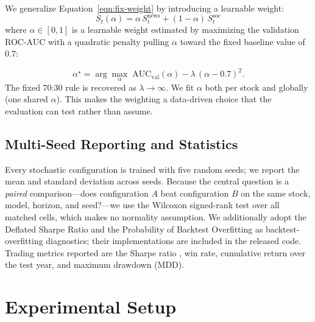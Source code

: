 \documentclass[conference]{IEEEtran}
\begin{document}
We generalize Equation~\ref{eqn:fix-weight} by introducing a learnable weight:
\begin{equation}
S_t(\alpha) = \alpha\,S^{\text{news}}_t + (1-\alpha)\,S^{\text{soc}}_t%
\end{equation}
%
where $\alpha\in[0,1]$ is a learnable weight estimated by maximizing the validation ROC-AUC 
%
with a quadratic penalty pulling $\alpha$
toward the fixed baseline value of $0.7$:

\begin{equation}
\alpha^\star = \arg\max_{\alpha}\;
\text{AUC}_{\text{val}}(\alpha) - \lambda\,(\alpha-0.7)^2 .
\end{equation}
The fixed 70:30 rule is recovered as $\lambda\!\to\!\infty$. We fit $\alpha$
both per stock and globally (one shared $\alpha$). This makes the weighting a
data-driven choice that the evaluation can test rather than assume.

\subsection{Multi-Seed Reporting and Statistics}
Every stochastic configuration is trained with five random seeds; we report
the mean and standard deviation across seeds. Because the central question is a
\emph{paired} comparison---does configuration $A$ beat configuration $B$ on the
same stock, model, horizon, and seed?---we use the Wilcoxon signed-rank test
over all matched cells, which makes no normality assumption. We additionally
adopt the Deflated Sharpe Ratio \cite{bailey2014dsr} and the Probability of
Backtest Overfitting \cite{bailey2016pbo} as backtest-overfitting diagnostics;
their implementations are included in the released code. Trading metrics
reported are the Sharpe ratio \cite{sharpe1966}, win rate, cumulative return
over the test year, and maximum drawdown (MDD).

\section{Experimental Setup}
\label{sec:setup}
\end{document}
